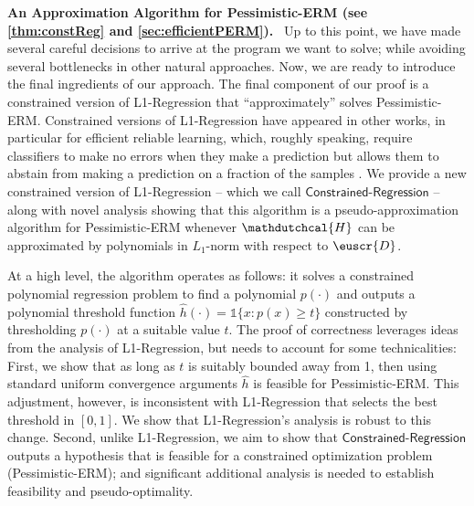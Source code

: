 \documentclass[11pt]{article}
\theoremstyle{plain}
\theoremstyle{definition}
\theoremstyle{remark}
\newcommand{\sinbrace}[1]{\{#1\}}
\newcommand{\wh}[1]{\widehat{#1}}
\newcommand{\customcal}[1]{\euscr{#1}}
\newcommand{\cD}{\customcal{D}}
\renewcommand{\paragraph}[1]{\medskip \noindent\textbf{#1}~}
\newcommand{\hypo}[1]{\mathdutchcal{#1}}
\newcommand{\hyH}{\hypo{H}}
\newcommand{\pERM}{Pessimistic-ERM}
\newcommand{\lreg}{\textsf{L1-Regression}}
\newcommand{\constrainedreg}{$\mathsf{Constrained\text{-}Regression}$} %
\newcommand{\nL}{L}
\begin{document}
        \paragraph{An Approximation Algorithm for \pERM{} (see \cref{thm:constReg} and  \cref{sec:efficientPERM}).} 
            Up to this point, we have made several careful decisions to arrive at the program we want to solve; while avoiding several bottlenecks in other natural approaches. 
            Now, we are ready to introduce the final ingredients of our approach. 
            The final component of our proof is a constrained version of \lreg{} that ``approximately'' solves \pERM{}.
            Constrained versions of \lreg{} have appeared in other works, in particular for efficient reliable learning, which, roughly speaking, require classifiers to make no errors when they make a prediction but allows them to abstain from making a prediction on a fraction of the samples \cite{kanade2014independentRealiable,kalai2012reliable}.
            We provide a new constrained version of \lreg{} -- which we call \constrainedreg{} -- along with novel analysis showing that this algorithm is a pseudo-approximation algorithm for \pERM{} whenever $\hyH$ can be approximated by polynomials in $\nL_1$-norm with respect to $\cD$.
            
            At a high level, the algorithm operates as follows: it solves a constrained polynomial regression problem to find a polynomial $p(\cdot)$ and outputs a polynomial threshold function $\wh{h}(\cdot)=\mathds{1}\sinbrace{x \colon p(x)\geq t}$ constructed by thresholding $p(\cdot)$ at a suitable value $t$.
            The proof of correctness leverages ideas from the analysis of \lreg{}, but needs to account for some technicalities:
            First, we show that as long as $t$ is suitably bounded away from 1, then using standard uniform convergence arguments $\wh{h}$ is feasible for \pERM{}.
            This adjustment, however, is inconsistent with \lreg{} that selects the best threshold in $[0, 1]$.
            We show that \lreg{}'s analysis is robust to this change.
            Second, unlike \lreg{}, we aim to show that \constrainedreg{} outputs a hypothesis that is feasible for a constrained optimization problem (\pERM{}); and significant additional analysis is needed to establish feasibility and pseudo-optimality.
        
\end{document}
